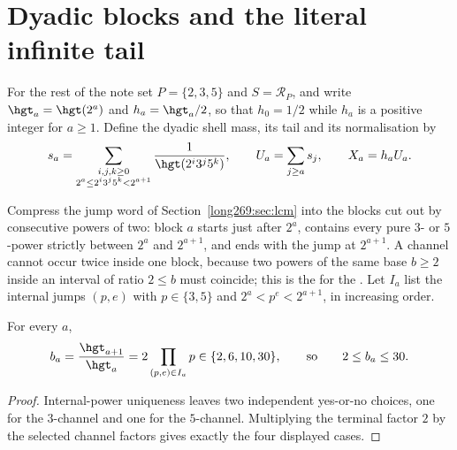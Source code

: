 \section{Dyadic blocks and the literal infinite tail}\label{long269:sec:blocks}

For the rest of the note set $P=\{2,3,5\}$ and $S=\mathcal R_P$, and write
$\hgt_a=\hgt(2^{a})$ and $h_a=\hgt_a/2$, so that $h_0=1/2$ while $h_a$ is a
positive integer for $a\ge1$.  Define the dyadic shell mass, its tail and its
normalisation by
\begin{equation}\label{long269:eq:actual-tail}
 s_a=\sum_{\substack{i,j,k\ge0\\ 2^{a}\le2^{i}3^{j}5^{k}<2^{a+1}}}
       \frac1{\hgt(2^{i}3^{j}5^{k})},
 \qquad
 U_a=\sum_{j\ge a}s_j,
 \qquad
 X_a=h_aU_a .
\end{equation}

Compress the jump word of Section~\ref{long269:sec:lcm} into the blocks cut out by
consecutive powers of two: block $a$ starts just after $2^{a}$, contains every
pure $3$- or $5$-power strictly between $2^{a}$ and $2^{a+1}$, and ends with
the jump at $2^{a+1}$.  A channel cannot occur twice inside one block, because
two powers of the same base $b\ge2$ inside an interval of ratio $2\le b$ must
coincide; this is the
 for the
.  Let $I_a$ list the internal jumps $(p,e)$
with $p\in\{3,5\}$ and $2^{a}<p^{e}<2^{a+1}$, in increasing order.

\begin{proposition}\label{long269:res:dyadic-alphabet}
For every $a$,
\begin{equation}\label{long269:eq:dyadic-alphabet}
 b_a=\frac{\hgt_{a+1}}{\hgt_a}=2\prod_{(p,e)\in I_a}p\in\{2,6,10,30\},
 \qquad\text{so}\qquad 2\le b_a\le30 .
\end{equation}
\end{proposition}

\begin{proof}
Internal-power uniqueness leaves two independent yes-or-no choices, one for the
$3$-channel and one for the $5$-channel.  Multiplying the terminal factor $2$
by the selected channel factors gives exactly the four displayed cases.
\end{proof}


